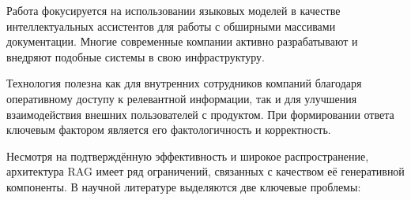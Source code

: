 \newpage



Работа фокусируется на использовании языковых моделей в качестве интеллектуальных ассистентов для работы с обширными массивами документации. Многие современные компании активно разрабатывают и внедряют подобные системы в свою инфраструктуру. 

Технология полезна как для внутренних сотрудников компаний благодаря оперативному доступу к релевантной информации, так и для улучшения взаимодействия внешних пользователей с продуктом. При формировании ответа ключевым фактором является его фактологичность и корректность.

Несмотря на подтверждённую эффективность и широкое распространение, архитектура RAG имеет ряд ограничений, связанных с качеством её генеративной компоненты. В научной литературе выделяются две ключевые проблемы:

